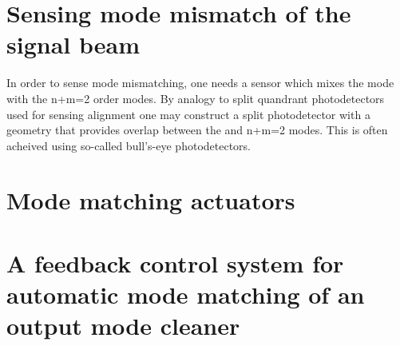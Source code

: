 
\section{Sensing mode mismatch of the signal beam}
In order to sense mode mismatching, one needs a sensor which mixes the  mode with the n+m=2 order modes. %
By analogy to split quandrant photodetectors used for sensing alignment one may construct a split photodetector with a geometry that provides overlap between the  and n+m=2 modes. %
This is often acheived using so-called bull's-eye photodetectors.


\section{Mode matching actuators}

\section{A feedback control system for automatic mode matching of an output mode cleaner}
